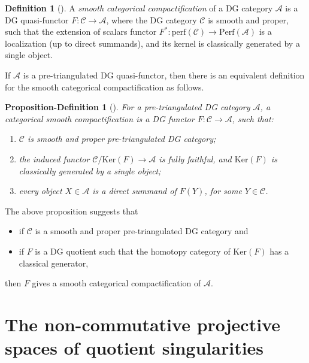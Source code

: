 \documentclass[11pt,reqno]{amsart}
\newtheorem{proposition-definition}[theorem]{Proposition-Definition}
\theoremstyle{definition}
\newtheorem{definition}[theorem]{Definition}
\begin{document}
\begin{definition}[{\cite[Definition 1.7]{Efi1}}]\label{def:smoothcatcomp}
A {\it smooth categorical compactification} of a DG category $\mathcal{A}$ is a
DG quasi-functor $F: \mathcal{C} \rightarrow \mathcal{A}$, where the
DG category $\mathcal{C}$ is smooth and proper, 
such that the extension of scalars
functor $F^{\ast}: \mathrm{perf}(\mathcal{C}) \rightarrow \mathrm{Perf}(\mathcal{A})$ is a
localization (up to direct summands), and its kernel is classically generated by a single object.
\end{definition}

If $\mathcal{A}$ is a pre-triangulated DG quasi-functor, then there is an equivalent
definition for the smooth categorical compactification as follows.

\begin{proposition-definition}[{\cite[Definition 2.2]{Efi}}]\label{Csc}
For a pre-triangulated DG category $\mathcal{A}$, a categorical smooth compactification is a DG functor 
$F: \mathcal{C} \rightarrow \mathcal{A}$, such that: 
\begin{enumerate}
\item $\mathcal{C}$ is smooth and proper pre-triangulated DG category;
\item the induced functor $\mathcal{C} / \mathrm{Ker}(F) \rightarrow \mathcal{A}$ is fully faithful,
and $\mathrm{Ker}(F)$ is classically generated by a single object;
\item every object $X \in \mathcal{A}$ is a direct summand of $F(Y)$, for some $Y \in \mathcal{C}$.
\end{enumerate}
\end{proposition-definition}

The above proposition suggests that
\begin{itemize}
\item
if $\mathcal{C}$ is a 
smooth and proper pre-triangulated DG category and 
\item
if $F$ is a DG quotient such that the homotopy 
category of $\mathrm{Ker}(F)$ has a classical generator, 
\end{itemize}
then $F$ gives a smooth categorical compactification of $\mathcal{A}$. 


\section{The non-commutative projective spaces of quotient singularities}\label{subsect:DGcat}
\end{document}
